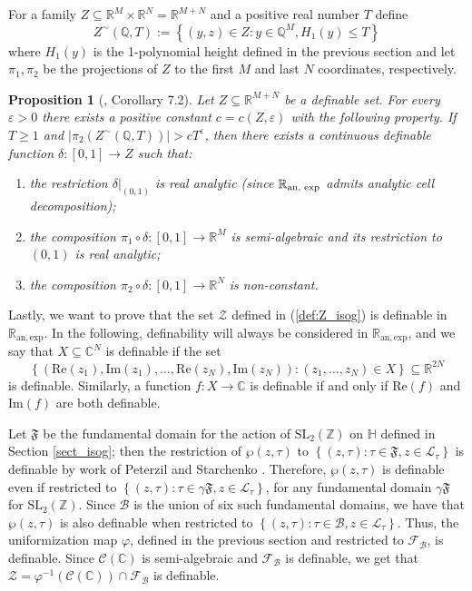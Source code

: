 \documentclass[11pt,a4paper,reqno]{amsart}
\numberwithin{equation}{section}
\newcommand{\Z}{\mathbb{Z}}
\newcommand{\Q}{\mathbb{Q}}
\newcommand{\R}{\mathbb{R}}
\newcommand{\C}{\mathbb{C}}
\renewcommand{\c}{\mathcal{C}}
\newcommand{\f}{\varphi}
\newcommand{\pt}[1]{\left( #1 \right)}
\newcommand{\pg}[1]{\left\lbrace #1 \right\rbrace}
\renewcommand{\Im}{\mathrm{Im}}
\renewcommand{\Re}{\mathrm{Re}}
\newtheorem{proposition}[theorem]{Proposition}
\theoremstyle{remark}
\theoremstyle{definition}
\theoremstyle{definition}
\begin{document}
For a family $Z \subseteq \R^M \times \R^N= \R^{M+N}$ and a positive real number $T$ define
\begin{equation*}
Z^{\sim}(\Q,T):=\pg{(y,z)\in Z: y \in \Q^M, H_1(y)\leq T}
\end{equation*}
where $H_1(y)$ is the 1-polynomial height defined in the previous section and let $ \pi_1, \pi_2 $ be the projections of $ Z $ to the first $ M $ and last $ N $ coordinates, respectively.
\begin{proposition}[\cite{HP16}, Corollary 7.2]\label{prop:thm_HP_isog}
Let $ Z \subseteq \R^{M+N}$ be a definable set. For every $ \varepsilon>0 $ there exists a positive constant $ c=c(Z,\varepsilon) $ with the following property. If $ T\geq 1 $ and $ \lvert \pi_2(Z^{\sim}(\Q,T)) \rvert>cT^{\varepsilon} $, then there exists a continuous definable function $ \delta: \left[0,1 \right] \rightarrow Z  $ such that:
\begin{enumerate}
\item the restriction $\delta \vert_{(0,1)}$ is real analytic (since $\R_{\text{\emph{an, exp}}}$ admits analytic cell decomposition);
\item the composition $ \pi_1\circ \delta: \left[0,1 \right] \rightarrow \R^M$ is semi-algebraic and its restriction to $ (0,1) $ is real analytic;
\item the composition $ \pi_2\circ \delta: \left[0,1 \right] \rightarrow \R^N$ is non-constant.
\end{enumerate}
\end{proposition}

Lastly, we want to prove that the set $\mathcal{Z}$ defined in (\ref{def:Z_isog}) is definable in $\R_{\mathrm{an, exp}}$. In the following, definability will always be considered in $\R_{\mathrm{an, exp}}$, and we say that $X \subseteq \C^N$ is definable if the set 
$$\pg{\pt{\Re(z_1), \Im(z_1), \ldots, \Re(z_N),\Im(z_N)}: (z_1, \ldots, z_N) \in X} \subseteq \R^{2N}$$
is definable. Similarly, a function $f: X \rightarrow \C$ is definable if and only if $\Re(f)$ and $\Im(f)$ are both definable.

Let $\mathfrak{F}$ be the fundamental domain for the action of $\mathrm{SL}_2(\Z)$ on $\mathbb{H}$ defined in Section \ref{sect_isog}; then the restriction of $\wp(z, \tau)$ to $\pg{(z, \tau): \tau \in \mathfrak{F}, z \in \mathcal{L}_{\tau}}$ is definable by work of Peterzil and Starchenko \cite{PS05}. Therefore, $\wp(z, \tau)$ is definable even if restricted to $\pg{(z, \tau): \tau \in \gamma \mathfrak{F}, z \in \mathcal{L}_{\tau}}$, for any fundamental domain  $\gamma \mathfrak{F}$ for $\mathrm{SL}_2(\Z)$. Since $\mathcal{B}$ is the union of six such fundamental domains, we have that $\wp(z, \tau)$ is also definable when restricted to $\pg{(z, \tau): \tau \in \mathcal{B}, z \in \mathcal{L}_{\tau}}$. 
Thus, the uniformization map $\f$, defined in the previous section and restricted to $\mathcal{F}_{\mathcal{B}}$, is definable. Since $\c(\C)$ is semi-algebraic and $\mathcal{F}_{\mathcal{B}}$ is definable, we get that $\mathcal{Z}=\f^{-1}(\c(\C))\cap \mathcal{F}_{\mathcal{B}}$ is definable.
\end{document}
